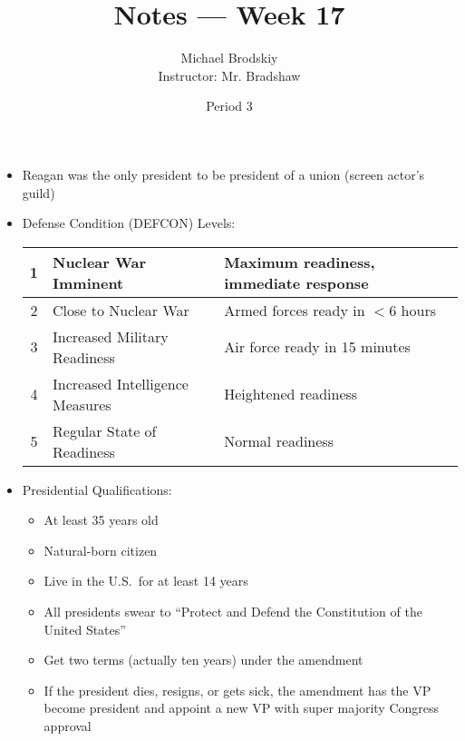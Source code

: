 \documentclass[12pt]{article}
\title{Notes — Week 17}
\date{Period 3}
\author{Michael Brodskiy\\ \small Instructor: Mr. Bradshaw}
\begin{document}
\maketitle

\begin{itemize}

  \item Reagan was the only president to be president of a union (screen actor's guild)

  \item Defense Condition (DEFCON) Levels:

    \begin{center}
      \begin{tabular}{| c | l | l|}
        \hline
        \cellcolor{white!55}1 & Nuclear War Imminent & Maximum readiness, immediate response\\
        \hline
        \cellcolor{red!55}2 & Close to Nuclear War & Armed forces ready in $<6$ hours\\
        \hline
        \cellcolor{yellow!55}3 & Increased Military Readiness & Air force ready in 15 minutes\\
        \hline
        \cellcolor{green!55}4 & Increased Intelligence Measures & Heightened readiness\\
        \hline
        \cellcolor{blue!55}5 & Regular State of Readiness & Normal readiness\\
        \hline
      \end{tabular}
    \end{center}

  \item Presidential Qualifications:

    \begin{itemize}

      \item At least 35 years old

      \item Natural-born citizen

      \item Live in the U.S.\ for at least 14 years

      \item All presidents swear to “Protect and Defend the Constitution of the United States”

      \item Get two terms (actually ten years) under the  amendment

      \item If the president dies, resigns, or gets sick, the  amendment has the VP become president and appoint a new VP with super majority Congress approval


\end{itemize}
\end{itemize}
\end{document}
